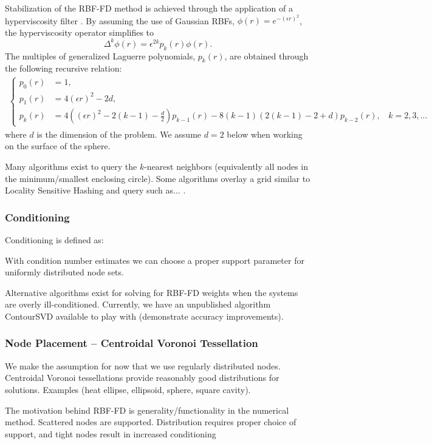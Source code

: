 \documentclass{report}
\begin{document}
{Stabilization of the RBF-FD method is achieved through the application of a hyperviscosity filter \cite{Fornberg2011b}. By assuming the use of Gaussian RBFs, $\phi(r) = e^{-(\epsilon r)^2}$, the hyperviscosity operator simplifies to
\begin{equation}
\Delta^{k}\phi(r) = \epsilon^{2k} p_k(r) \phi(r).
\label{eqn:gaussian_hv}
\end{equation}
The multiples of generalized Laguerre polynomials, $p_k(r)$, are obtained through the following recursive relation:
\begin{align*}
\begin{cases} 
p_0(r) &=1, \\
p_1(r) &= 4(\epsilon r)^2 - 2d, \\
p_k(r) &= 4((\epsilon r)^2 - 2(k-1) - \frac{d}{2})  p_{k-1}(r) - 8(k-1)(2(k-1) - 2 + d) p_{k-2}(r), \ \ \ \ k = 2, 3, ...
\end{cases}
\end{align*}
where $d$ is the dimension of the problem. We assume $d=2$ below when working on the surface of the sphere.


Many algorithms exist to query the $k$-nearest neighbors (equivalently all nodes in the minimum/smallest enclosing circle). Some algorithms overlay a grid similar to Locality Sensitive Hashing and query such as... \cite{HarPeledMazumdar2003}.


\subsubsection{Conditioning} 
Conditioning is defined as: 

With condition number estimates we can choose a proper support parameter for uniformly distributed node sets.

Alternative algorithms exist for solving for RBF-FD weights when the systems are overly ill-conditioned. Currently, we have an unpublished algorithm ContourSVD available to play with (demonstrate accuracy improvements). 

\subsubsection{Node Placement -- Centroidal Voronoi Tessellation}
We make the assumption for now that we use regularly distributed nodes. Centroidal Voronoi tessellations provide reasonably good distributions for solutions. Examples (heat ellipse, ellipsoid, sphere, square cavity).

The motivation behind RBF-FD is generality/functionality in the numerical method. Scattered nodes are supported. Distribution requires proper choice of support, and tight nodes result in increased conditioning

}
\end{document}

